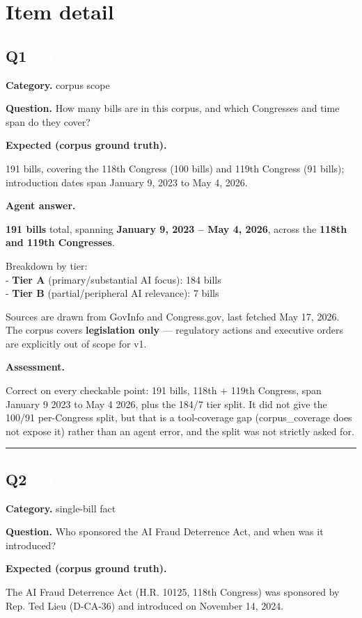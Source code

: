\documentclass[11pt]{article}
\newcommand{\fieldlabel}[1]{\textbf{\color{navy}#1}\quad}
\begin{document}
\section*{Item detail}
\subsection*{Q1 \quad \colorbox{passgreen}{\textcolor{white}{\bfseries PASS}}}
\fieldlabel{Category.} corpus scope\par
\fieldlabel{Question.} How many bills are in this corpus, and which Congresses and time span do they cover?\par
\fieldlabel{Expected (corpus ground truth).}\par
191 bills, covering the 118th Congress (100 bills) and 119th Congress (91 bills); introduction dates span January 9, 2023 to May 4, 2026.

\fieldlabel{Agent answer.}\par
\textbf{191 bills} total, spanning \textbf{January 9, 2023 -- May 4, 2026}, across the \textbf{118th and 119th Congresses}.

Breakdown by tier: \\
- \textbf{Tier A} (primary/substantial AI focus): 184 bills \\
- \textbf{Tier B} (partial/peripheral AI relevance): 7 bills

Sources are drawn from GovInfo and Congress.gov, last fetched May 17, 2026. The corpus covers \textbf{legislation only} --- regulatory actions and executive orders are explicitly out of scope for v1.

\fieldlabel{Assessment.} \colorbox{passgreen}{\textcolor{white}{\bfseries PASS}}\par
Correct on every checkable point: 191 bills, 118th + 119th Congress, span January 9 2023 to May 4 2026, plus the 184/7 tier split. It did not give the 100/91 per-Congress split, but that is a tool-coverage gap (corpus\_coverage does not expose it) rather than an agent error, and the split was not strictly asked for.
\vspace{4pt}\hrule\vspace{8pt}
\subsection*{Q2 \quad \colorbox{passgreen}{\textcolor{white}{\bfseries PASS}}}
\fieldlabel{Category.} single-bill fact\par
\fieldlabel{Question.} Who sponsored the AI Fraud Deterrence Act, and when was it introduced?\par
\fieldlabel{Expected (corpus ground truth).}\par
The AI Fraud Deterrence Act (H.R. 10125, 118th Congress) was sponsored by Rep. Ted Lieu (D-CA-36) and introduced on November 14, 2024.
\end{document}
